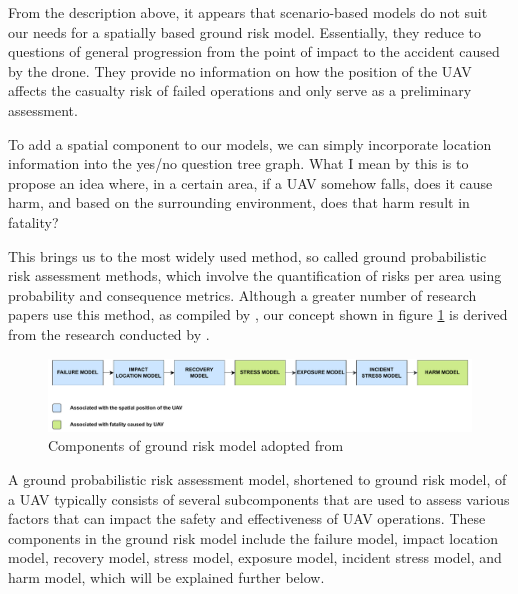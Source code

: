 \documentclass[12pt]{report}
\begin{document}
        From the description above, it appears that scenario-based models do not suit our needs for a spatially based
        ground risk model. Essentially, they reduce to questions of general progression from the point of impact to the
        accident caused by the drone. They provide no information on how the position of the UAV affects the casualty
        risk of failed operations and only serve as a preliminary assessment.
            
        To add a spatial component to our models, we can simply incorporate location information into the yes/no
        question tree graph. What I mean by this is to propose an idea where, in a certain area, if a UAV somehow falls,
        does it cause harm, and based on the surrounding environment, does that harm result in fatality?
            
        This brings us to the most widely used method, so called ground probabilistic risk assessment methods, which
        involve the quantification of risks per area using probability and consequence metrics. Although a greater
        number of research papers use this method, as compiled by \cite{washington_review_2017}, our concept shown in
        figure \ref{fig:prime_example} is derived from the research conducted by \cite{primatesta_ground_2020}. 

        \begin{figure}[H]
            \centering
            \includegraphics[width=\textwidth]{General Image/OSM Drone-GROUND.pdf}
            \caption{Components of ground risk model adopted from \protect\cite{primatesta_ground_2020}}
            \label{fig:prime_example}
        \end{figure}

        A ground probabilistic risk assessment model, shortened to ground risk model, of a UAV typically consists of
        several subcomponents that are used to assess various factors that can impact the safety and effectiveness of
        UAV operations. These components in the ground risk model include the failure model, impact location model,
        recovery model, stress model, exposure model, incident stress model, and harm model, which will be explained
        further below.
\end{document}
